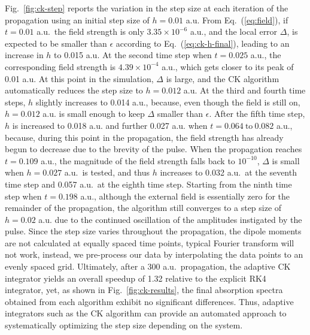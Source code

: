 Fig.~\ref{fig:ck-step} reports the variation in the step size at each iteration
of the propagation using an initial step size of $h=0.01$ a.u.  From
Eq.~(\ref{eq:field}), if $t=0.01$ a.u.\ the field strength is only $3.35\times
10^{-6}$ a.u., and the local error $\Delta$, is expected to be smaller than
$\epsilon$ according to Eq.~(\ref{eq:ck-h-final}), leading to an increase in
$h$ to 0.015 a.u.  At the second time step when $t=0.025$ a.u., the
corresponding field strength is $4.39\times 10^{-4}$ a.u., which gets closer to
its peak of 0.01 a.u.  At this point in the simulation, $\Delta$ is large, and
the CK algorithm automatically reduces the step size to $h=0.012$ a.u.  At the
third and fourth time steps, $h$ slightly increases to 0.014 a.u., because,
even though the field is still on, $h=0.012$ a.u. is small enough to keep
$\Delta$ smaller than $\epsilon$. After the fifth time step, $h$ is increased
to 0.018 a.u. and further 0.027 a.u. when $t=0.064 ~\textrm{to}~ 0.082$ a.u.,
because, during this point in the propagation, the field strength has already
begun to decrease due to the brevity of the pulse.  When the propagation
reaches $t=0.109$ a.u., the magnitude of the field strength falls back to
$10^{-10}$, $\Delta$ is small when $h=0.027$ a.u.\ is tested, and thus $h$
increases to 0.032 a.u.\ at the seventh time step and 0.057 a.u.\ at the eighth
time step. Starting from the ninth time step when $t=0.198$ a.u., although the
external field is essentially zero for the remainder of the propagation, the
algorithm still converges to a step size of $h=0.02$ a.u. due to the continued
oscillation of the amplitudes instigated by the pulse. Since the step size varies 
throughout the propagation, the dipole moments are not calculated at equally 
spaced time points, typical Fourier transform will not work, instead, we pre-process 
our data by interpolating the data points to an evenly spaced grid. Ultimately, after a 300
a.u.\ propagation, the adaptive CK integrator yields an overall speedup of 1.32
relative to the explicit RK4 integrator, yet, as shown in
Fig.~\ref{fig:ck-results}, the final absorption spectra obtained from each
algorithm exhibit no significant differences.  Thus, adaptive integrators such
as the CK algorithm can provide an automated approach to systematically
optimizing the step size depending on the system.

